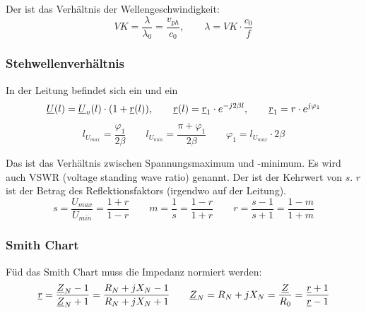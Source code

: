 \documentclass{article}
\begin{document}
\begin{twocolumn}
Der  ist das Verhältnis der Wellengeschwindigkeit:
$$VK = \frac{\lambda}{\lambda_0} = \frac{v_{ph}}{c_0}, \qquad \lambda = VK \cdot \frac{c_0}{f}$$

\subsubsection{Stehwellenverhältnis}
In der Leitung befindet sich ein  und ein 
$$\underline{U}(l) = \underline{U}_v(l) \cdot (1 + \underline{r}(l)), \qquad \underline{r}(l) = \underline{r}_1 \cdot e^{-j 2 \beta l}, \qquad \underline{r}_1 = r \cdot e^{j \varphi_1}$$
$$l_{U_{max}} = \frac{\varphi_1}{2 \beta} \qquad l_{U_{min}} = \frac{\pi + \varphi_1}{2\beta} \qquad \varphi_1 = l_{U_{max}} \cdot 2 \beta$$

Das  ist das Verhältnis zwischen Spannungsmaximum und -minimum. 
Es wird auch VSWR (voltage standing wave ratio) genannt. 
Der  ist der Kehrwert von $s$.
$r$ ist der Betrag des Reflektionsfaktors (irgendwo auf der Leitung).
$$s = \frac{U_{max}}{U_{min}} = \frac{1+r}{1-r} \qquad m = \frac{1}{s} = \frac{1-r}{1+r} \qquad r = \frac{s-1}{s+1} = \frac{1-m}{1+m}$$

\subsubsection{Smith Chart}
Füd das Smith Chart muss die Impedanz normiert werden:  
$$\underline{r} = \frac{\underline{Z}_N - 1}{\underline{Z}_N + 1} = \frac{R_N + j X_N - 1}{R_N + j X_N + 1} \qquad \underline{Z}_N = R_N + j X_N = \frac{\underline{Z}}{R_0} = \frac{\underline{r} + 1}{\underline{r} - 1}$$


\end{twocolumn}
\end{document}
